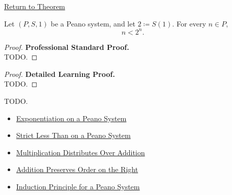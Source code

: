 \newpage
{}
\label{prf:n-less-than-2-to-n}

\begin{remark*}[Return]
\hyperref[thm:n-less-than-2-to-n]{Return to Theorem}
\end{remark*}

\begin{theorem*}
Let $(P,S,1)$ be a Peano system, and let $2 \coloneqq S(1)$.
For every $n \in P$,
\[
n < 2^n.
\]
\end{theorem*}

\begin{proof}
\textbf{Professional Standard Proof.}~\\
TODO.
\end{proof}

\begin{proof}
\textbf{Detailed Learning Proof.}~\\
TODO.
\end{proof}

\begin{remark*}
TODO.
\end{remark*}

\begin{dependencies}
\begin{itemize}
  \item \hyperref[def:exponentiation-on-peano-system]{Exponentiation on a Peano System}
  \item \hyperref[def:strict-less-than-on-peano-system]{Strict Less Than on a Peano System}
  \item \hyperref[thm:multiplication-distributes-over-addition]{Multiplication Distributes Over Addition}
  \item \hyperref[thm:addition-preserves-order-on-right]{Addition Preserves Order on the Right}
  \item \hyperref[thm:induction-principle-for-peano-system]{Induction Principle for a Peano System}
\end{itemize}
\end{dependencies}
